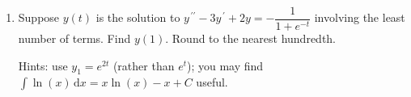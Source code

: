 \documentclass{ximera}
\begin{document}
\begin{enumerate}[label=(\arabic*)]






\item  Suppose $y(t)$ is the solution to $y^{\,\prime\prime}-3y^{\,\prime}+2y=-\dfrac{1}{1+e^{-t}}$ involving the least number of terms.  Find $y(1)$.  Round to the nearest hundredth.

Hints:  use $y_1=e^{2t}$ (rather than $e^t$); you may find \\$\displaystyle \int \ln (x)\,\mathrm{d}x=x\ln (x)-x+C$ useful.














\end{enumerate}
\end{document}
